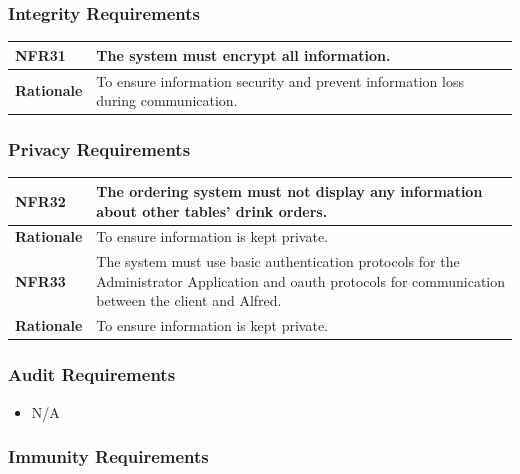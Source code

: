 \documentclass [11pt]{article}
\begin{document}
\subsubsection{Integrity Requirements }

\begin{longtable}{| p{ } | p{ } | }\hline 
\rowcolor{tableCell}\textbf{NFR31} & The system must encrypt all information.\\ \hline
\textbf{Rationale} &  To ensure information security and prevent information loss during communication.\\ \hline
\end{longtable}

\subsubsection{Privacy Requirements }

\begin{longtable}{| p{ } | p{ } | }\hline 
\rowcolor{tableCell}\textbf{NFR32} & The ordering system must not display any information about other tables' drink orders.\\ \hline
\textbf{Rationale} &  To ensure information is kept private.\\ \hline 

\rowcolor{tableCell}\textbf{NFR33} & The system must use basic authentication protocols for the Administrator Application and oauth protocols for communication between the client and Alfred. \\ \hline
\textbf{Rationale} &  To ensure information is kept private.\\ \hline 
\end{longtable}

\subsubsection{Audit  Requirements}
	
	\begin{itemize}
		\item N/A
	\end{itemize} 

\subsubsection{Immunity Requirements}
\end{document}

